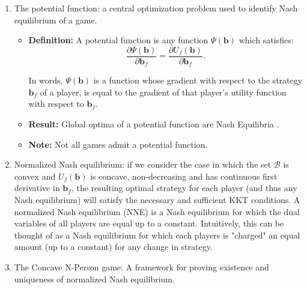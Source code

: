 \begin{enumerate}
\item The potential function: a central optimization problem used to identify Nash equilibrium of a game.
\begin{itemize}
\item
\textbf{Definition:}  A potential function is any function
$ \Psi(\mathbf{b})$ which satisfies:
\begin{equation}\label{potential_game_condition}
\frac{\partial \Psi(\mathbf{b})}{\partial \mathbf{b}_{f}}
 =
 \frac{\partial U_f(\mathbf{b})}{\partial \mathbf{b}_{f}}.
\end{equation} 

In words, $ \Psi(\mathbf{b})$ is a function whose gradient with respect to the strategy $\mathbf{b}_{f}$ of a player, is equal to the gradient of that player's utility function with respect to $\mathbf{b}_{f}$.

\item \textbf{Result:} Global optima of a potential function are Nash Equilibria \cite{monderer1996potential}.
\item \textbf{Note:} Not all games admit a potential function.


\end{itemize}

\item Normalized Nash equilibrium: if we consider the case in which the set $\mathcal{B}$ is convex and $U_f(\mathbf{b})$ is concave, non-decreasing and has continuous first derivative in $\mathbf{b}_{f}$, the resulting optimal strategy for each player (and thus any Nash equilibrium) will satisfy the necessary and sufficient KKT conditions. A normalized Nash equilibrium (NNE) is a Nash equilibrium for which the dual variables of all players are equal up to a constant. 
Intuitively, this can be thought of as a Nash equilibrium for which each players is "charged" an equal amount (up to a constant) for any change in strategy.

\item The Concave N-Person game: A framework for proving existence and uniqueness of normalized Nash equilibrium.


\end{enumerate}
